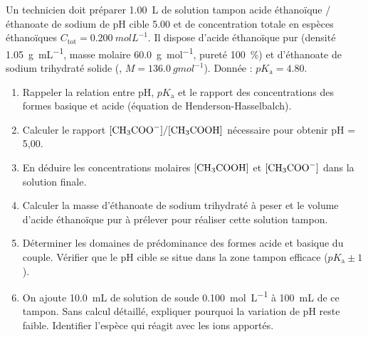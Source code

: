 \documentclass[11pt]{article}
\begin{document}
\begin{exercice}
Un technicien doit préparer \SI{1.00}{L} de solution tampon acide éthanoïque / éthanoate de sodium de pH cible \num{5.00} et de concentration totale en espèces éthanoïques $C_{\text{tot}} = \SI{0.200}{mol L^{-1}}$. Il dispose d'acide éthanoïque pur (densité \SI{1.05}{g mL^{-1}}, masse molaire \SI{60.0}{g mol^{-1}}, pureté \SI{100}{\%}) et d'éthanoate de sodium trihydraté solide (, $M = \SI{136.0}{g mol^{-1}}$). Donnée : $pK_{\text{a}} = 4.80$.
\begin{enumerate}
    \item Rappeler la relation entre pH, $pK_{\text{a}}$ et le rapport des concentrations des formes basique et acide (équation de Henderson-Hasselbalch).
    \item Calculer le rapport $[\ce{CH3COO-}] / [\ce{CH3COOH}]$ nécessaire pour obtenir pH = 5,00.
    \item En déduire les concentrations molaires $[\ce{CH3COOH}]$ et $[\ce{CH3COO-}]$ dans la solution finale.
    \item Calculer la masse d'éthanoate de sodium trihydraté à peser et le volume d'acide éthanoïque pur à prélever pour réaliser cette solution tampon.
    \item Déterminer les domaines de prédominance des formes acide et basique du couple. Vérifier que le pH cible se situe dans la zone tampon efficace ($pK_{\text{a}} \pm 1$).
    \item On ajoute \SI{10.0}{mL} de solution de soude \SI{0.100}{mol L^{-1}} à \SI{100}{mL} de ce tampon. Sans calcul détaillé, expliquer pourquoi la variation de pH reste faible. Identifier l'espèce qui réagit avec les ions  apportés.
\end{enumerate}
\end{exercice}
\end{document}
